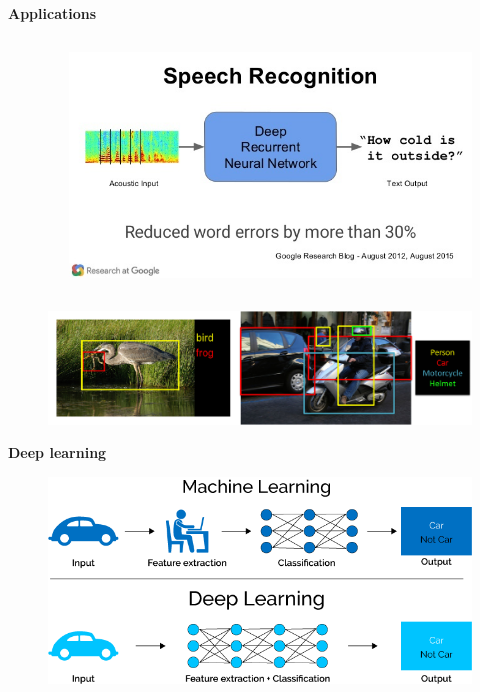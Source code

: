 \documentclass[xcolor=dvipsnames]{beamer}
\begin{document}
\begin{frame}{\bf Applications}
\begin{columns}
\begin{column}{0.33\textwidth}
    \end{column}


    \begin{column}{0.33\textwidth}  %

        \begin{figure}
        \includegraphics[scale=0.15]{../../pictures/speach_recognition.jpg}
        \end{figure}

    \end{column}

\end{columns}


\begin{figure}
\includegraphics[scale=0.2]{../../pictures/image_recognition.png}
\end{figure}


\end{frame}


\begin{frame}{\bf Deep learning}

  \begin{figure}
    \includegraphics[scale=0.4]{../../pictures/end_to_end_learning.png}
  \end{figure}

\end{frame}
\end{document}
